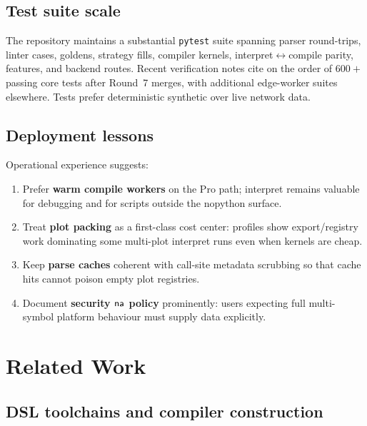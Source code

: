 \documentclass[11pt,a4paper]{article}
\begin{document}
\subsection{Test suite scale}
\label{sec:tests}

The repository maintains a substantial \texttt{pytest} suite spanning parser
round-trips, linter cases, \ta{} goldens, strategy fills, compiler kernels,
interpret$\leftrightarrow$compile parity, \lsp{} features, and backend routes.
Recent verification notes cite on the order of $600+$ passing core tests after
Round~7 merges, with additional edge-worker suites elsewhere.
Tests prefer deterministic synthetic \ohlcv{} over live network data.

\subsection{Deployment lessons}
\label{sec:deploy}

Operational experience suggests:

\begin{enumerate}[leftmargin=1.4em]
  \item Prefer \textbf{warm compile workers} on the Pro path; interpret remains
    valuable for debugging and for scripts outside the nopython surface.
  \item Treat \textbf{plot packing} as a first-class cost center: profiles show
    export/registry work dominating some multi-plot interpret runs even when
    kernels are cheap.
  \item Keep \textbf{parse caches} coherent with call-site metadata scrubbing so
    that cache hits cannot poison empty plot registries.
  \item Document \textbf{security $\textsf{na}$ policy} prominently: users expecting
    full multi-symbol platform behaviour must supply data explicitly.
\end{enumerate}

\section{Related Work}
\label{sec:related}

\subsection{DSL toolchains and compiler construction}
\label{sec:rw-dsl}
\end{document}
